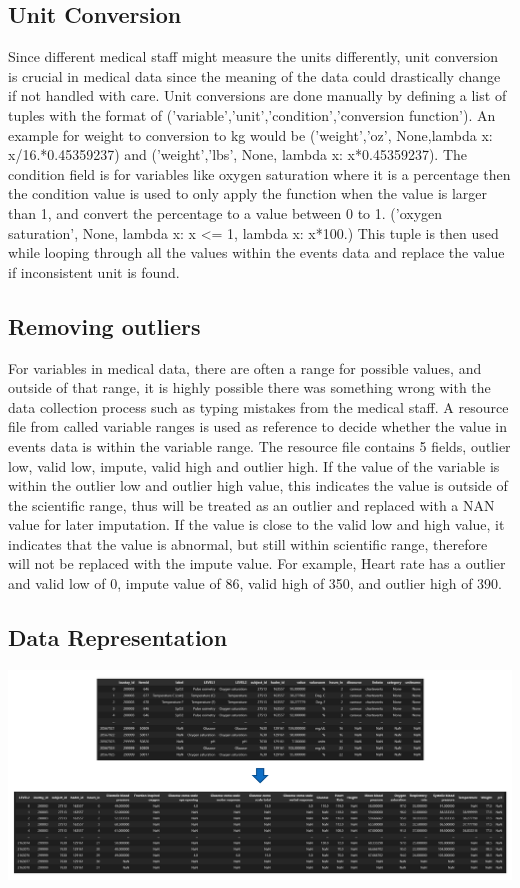 \documentclass{l4proj}
\begin{document}
\subsection{Unit Conversion}
Since different medical staff might measure the units differently, unit conversion is crucial in medical data since the meaning of the data could drastically change if not handled with care. Unit conversions are done manually by defining a list of tuples with the format of ('variable','unit','condition','conversion function'). An example for weight to conversion to kg would be ('weight','oz',  None,lambda x: x/16.*0.45359237) and ('weight','lbs', None, lambda x: x*0.45359237). The condition field is for variables like oxygen saturation where it is a percentage then the condition value is used to only apply the function when the value is larger than 1, and convert the percentage to a value between 0 to 1. ('oxygen saturation', None,  lambda x: x <= 1, lambda x: x*100.) This tuple is then used while looping through all the values within the events data and replace the value if inconsistent unit is found.


\subsection{Removing outliers}
For variables in medical data, there are often a range for possible values, and outside of that range, it is highly possible there was something wrong with the data collection process such as typing mistakes from the medical staff. A resource file from \cite{MIMIC_Extract_Github} called variable ranges is used as reference to decide whether the value in events data is within the variable range. The resource file contains 5 fields, outlier low, valid low, impute, valid high and outlier high. If the value of the variable is within the outlier low and outlier high value, this indicates the value is outside of the scientific range, thus will be treated as an outlier and replaced with a NAN value for later imputation. If the value is close to the valid low and high value, it indicates that the value is abnormal, but still within scientific range, therefore will not be replaced with the impute value. For example, Heart rate has a outlier and valid low of 0, impute value of 86, valid high of 350, and outlier high of 390. 

\subsection{Data Representation}
\includegraphics[width=\textwidth]{dissertation/Latex/images/reshape.PNG}
\end{document}

